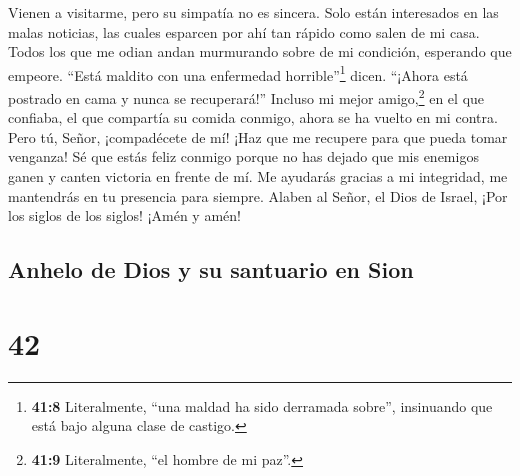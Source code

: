  Vienen a visitarme, pero su simpatía no es sincera. Solo
están interesados en las malas noticias, las cuales esparcen por ahí tan
rápido como salen de mi casa.  Todos los que me odian
andan murmurando sobre de mi condición, esperando que empeore.
 ``Está maldito con una enfermedad horrible''\footnote{\textbf{41:8}
  Literalmente, ``una maldad ha sido derramada sobre'', insinuando que
  está bajo alguna clase de castigo.} dicen. ``¡Ahora está postrado en
cama y nunca se recuperará!''  Incluso mi mejor
amigo,\footnote{\textbf{41:9} Literalmente, ``el hombre de mi paz''.} en
el que confiaba, el que compartía su comida conmigo, ahora se ha vuelto
en mi contra.  Pero tú, Señor, ¡compadécete de mí! ¡Haz
que me recupere para que pueda tomar venganza!  Sé que
estás feliz conmigo porque no has dejado que mis enemigos ganen y canten
victoria en frente de mí.  Me ayudarás gracias a mi
integridad, me mantendrás en tu presencia para siempre. 
Alaben al Señor, el Dios de Israel, ¡Por los siglos de los siglos! ¡Amén
y amén!

\hypertarget{anhelo-de-dios-y-su-santuario-en-sion}{%
\subsection{Anhelo de Dios y su santuario en
Sion}\label{anhelo-de-dios-y-su-santuario-en-sion}}

\hypertarget{section-41}{%
\section{42}\label{section-41}}

